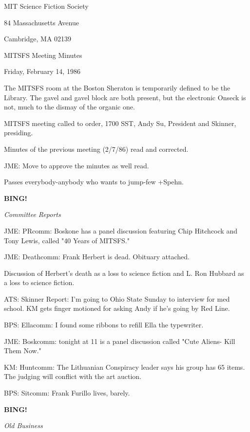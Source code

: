 \documentclass[12pt]{article}
\newcommand{\bing}{{\bf BING!} }
\newcommand{\goto}[1]{\bing \vskip 12pt \centerline{{\em{#1}}}}
\begin{document}
\begin{center}

MIT Science Fiction Society 

84 Massachusetts Avenue

Cambridge, MA 02139

\vspace{12pt}

MITSFS Meeting Minutes 

Friday, February 14, 1986

\end{center}
 
\vspace{18pt}

\setlength{\parskip}{6pt}

\noindent
The MITSFS room at the Boston Sheraton is temporarily defined to be the Library. The gavel and gavel block are both present, but the electronic Onseck is not, much to the dismay of the organic one.

MITSFS meeting called to order, 1700 SST,
Andy Su, President and Skinner, presiding.

Minutes of the previous meeting (2/7/86) read and corrected.

JME: Move to approve the minutes as well read.

Passes everybody-anybody who wants to jump-few +Spehn.

\goto{Committee Reports}

JME: PRcomm: Boskone has a panel discussion featuring Chip Hitchcock and Tony Lewis, called "40 Years of MITSFS."

JME: Deathcomm: Frank Herbert is dead. Obituary attached.

Discussion of Herbert's death as a loss to science fiction and L. Ron Hubbard as a loss to science fiction.

ATS: Skinner Report: I'm going to Ohio State Sunday to interview for med school. KM gets finger motioned for asking Andy if he's going by Red Line.

BPS: Ellacomm: I found some ribbons to refill Ella the typewriter.

JME: Boskcomm: tonight at 11 is a panel discussion called "Cute Aliens- Kill Them Now."

KM: Huntcomm: The Lithuanian Conspiracy leader says his group has 65 items. The judging will conflict with the art auction.

BPS: Sitcomm: Frank Furillo lives, barely.

\goto{Old Business}
\end{document}
